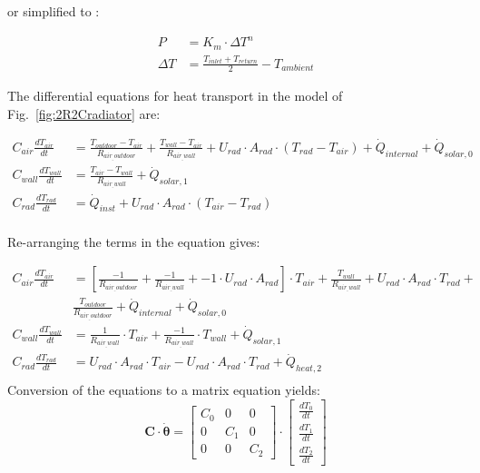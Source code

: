or simplified to \cite{NEN442, OEM442}:

\begin{equation}
	\begin{aligned}
		P & = K_m \cdot \Delta T^n \\
		\Delta T & = \frac{ T_{inlet} + T_{return} }{2} - {T_{ambient}}
	\end{aligned}
\end{equation}

The differential equations for heat transport in the model of Fig.~\ref{fig:2R2Cradiator} are:

\begin{equation}
	\begin{aligned}
		C_{air} \frac{dT_{air}}{dt} &= \frac{T_{outdoor}-T_{air}}{R_{air_{\_}outdoor}} + \frac{T_{wall}-T_{air}}{R_{air_{\_}wall}} + U_{rad} \cdot A_{rad} \cdot (T_{rad} - T_{air}) + \dot{Q}_{internal} + \dot{Q}_{solar, 0} \\
		C_{wall} \frac{dT_{wall}}{dt} &= \frac{T_{air}-T_{wall}}{R_{air_{\_}wall}} + \dot{Q}_{solar, 1} \\
		C_{rad} \frac{dT_{rad}}{dt} &= \dot{Q}_{inst} + U_{rad} \cdot A_{rad} \cdot (T_{air} - T_{rad}) \\
	\end{aligned}
\end{equation}

Re-arranging the terms in the equation gives:

\begin{equation}
	\begin{aligned}
		C_{air} \frac{dT_{air}}{dt} &= \left[ \frac{-1}{R_{air_{\_}outdoor}} + \frac{-1}{R_{air_{\_}wall}} +  -1 \cdot U_{rad} \cdot A_{rad} \right] \cdot T_{air} + \frac{T_{wall}}{R_{air_{\_}wall}} +  U_{rad} \cdot A_{rad} \cdot T_{rad} + \\
		& \frac{T_{outdoor}}{R_{air_{\_}outdoor}}  + \dot{Q}_{internal} + \dot{Q}_{solar, 0} \\
		C_{wall} \frac{dT_{wall}}{dt} &= \frac{1}{R_{air_{\_}wall}} \cdot T_{air} + \frac{-1}{R_{air_{\_}wall}} \cdot T_{wall} + \dot{Q}_{solar, 1} \\
		C_{rad} \frac{dT_{rad}}{dt} &=  U_{rad} \cdot A_{rad} \cdot T_{air} - U_{rad} \cdot A_{rad} \cdot T_{rad} + \dot{Q}_{heat, 2}\\
	\end{aligned}
\end{equation}
Conversion of the equations to a matrix equation yields:
\begin{equation}
	\mathbf{C} \cdot \boldsymbol{\dot{\theta}} =
	\begin{bmatrix}
		C_{0} & 0 & 0 \\
		0 &  C_{1} & 0  \\
		0 & 0 & C_{2} 
	\end{bmatrix}
	\cdot
	\begin{bmatrix}
		\frac{dT_{0}}{dt} \\
		\frac{dT_{1}}{dt} \\
		\frac{dT_{2}}{dt} 
	\end{bmatrix}
\end{equation}

